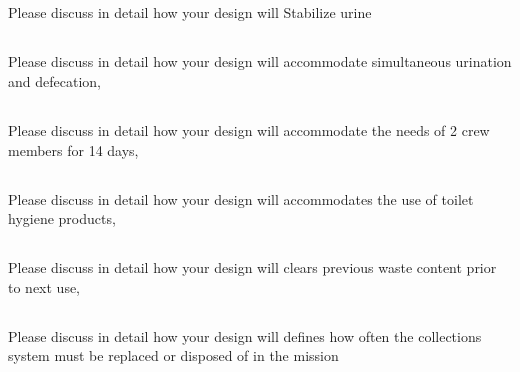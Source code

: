     \subsection{}
    Please discuss in detail how your design will Stabilize urine
    
    \subsection{}
    Please discuss in detail how your design will accommodate simultaneous urination and defecation,

    \subsection{}
    Please discuss in detail how your design will accommodate the needs of 2 crew members for 14 days,

    \subsection{}
    Please discuss in detail how your design will accommodates the use of toilet hygiene products,

    \subsection{}
    Please discuss in detail how your design will clears previous waste content prior to next use,

    \subsection{}
    Please discuss in detail how your design will defines how often the collections system must be replaced or disposed of in the mission
